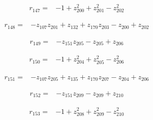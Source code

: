 \par\noindent\begin{minipage}{\linewidth}
\begin{align*}
r_{147}={}&-1+z_{200}^{2}+z_{201}^{2}-z_{202}^{2}
\end{align*}
\end{minipage}\par
\par\noindent\begin{minipage}{\linewidth}
\begin{align*}
r_{148}={}&-z_{107}z_{201}+z_{132}+z_{170}z_{203}-z_{200}+z_{202}
\end{align*}
\end{minipage}\par
\par\noindent\begin{minipage}{\linewidth}
\begin{align*}
r_{149}={}&-z_{151}z_{205}-z_{205}+z_{206}
\end{align*}
\end{minipage}\par
\par\noindent\begin{minipage}{\linewidth}
\begin{align*}
r_{150}={}&-1+z_{204}^{2}+z_{205}^{2}-z_{206}^{2}
\end{align*}
\end{minipage}\par
\par\noindent\begin{minipage}{\linewidth}
\begin{align*}
r_{151}={}&-z_{107}z_{205}+z_{135}+z_{170}z_{207}-z_{204}+z_{206}
\end{align*}
\end{minipage}\par
\par\noindent\begin{minipage}{\linewidth}
\begin{align*}
r_{152}={}&-z_{151}z_{209}-z_{209}+z_{210}
\end{align*}
\end{minipage}\par
\par\noindent\begin{minipage}{\linewidth}
\begin{align*}
r_{153}={}&-1+z_{208}^{2}+z_{209}^{2}-z_{210}^{2}
\end{align*}
\end{minipage}\par
